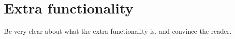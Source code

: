 \chapter{Extra functionality}

Be very clear about what the extra functionality is, and convince the reader. 


